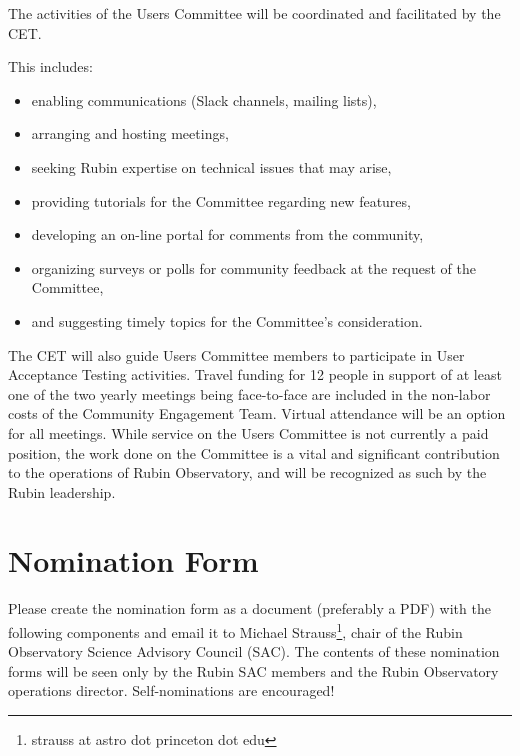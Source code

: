 \documentclass[OPS,toc]{lsstdoc}
\begin{document}
The activities of the Users Committee will be coordinated and facilitated by the CET.

This includes:
\begin{itemize}
\item enabling communications (Slack channels, mailing lists),
\item arranging and hosting meetings,
\item seeking Rubin expertise on technical issues that may arise,
\item providing tutorials for the Committee regarding new features,
\item developing an on-line portal for comments from the community,
\item organizing surveys or polls for community feedback at the request of the Committee, 
\item and suggesting timely topics for the Committee’s consideration.
\end{itemize}

The CET will also guide Users Committee members to participate in User Acceptance Testing activities.
Travel funding for 12 people in support of at least one of the two yearly meetings being face-to-face are included in the non-labor costs of the Community Engagement Team.
Virtual attendance will be an option for all meetings.
While service on the Users Committee is not currently a paid position, the work done on the Committee is a vital and significant contribution to the operations of Rubin Observatory, and will be recognized as such by the Rubin leadership. 

\clearpage

\appendix

\section{Nomination Form}\label{sec:apA}

Please create the nomination form as a document (preferably a PDF) with the following components and email it to Michael Strauss\footnote{strauss at astro dot princeton dot edu}, chair of the Rubin Observatory Science Advisory Council (SAC).
The contents of these nomination forms will be seen only by the Rubin SAC members and the Rubin Observatory operations director.
Self-nominations are encouraged!
\end{document}
